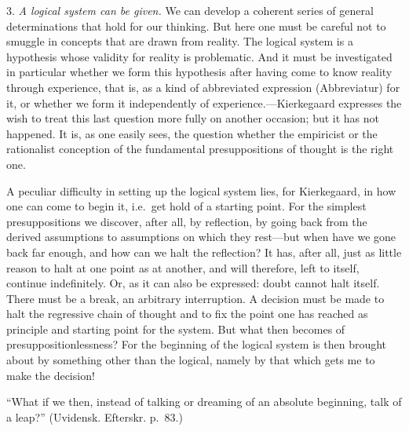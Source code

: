 \documentclass[12pt,a4paper]{book}
\newcommand{\opage}[1]{\marginnote{\footnotesize\textit{[#1]}}}
\begin{document}
3. \textit{A logical system can be given.} We can develop a coherent
series of general determinations that hold for our thinking. But here
one must be careful not to smuggle in concepts that are drawn from
reality. The logical system is a hypothesis whose validity for reality
is problematic. And it must be investigated in particular whether we form
\opage{61}this hypothesis after having come to know reality through experience,
that is, as a kind of abbreviated expression (Abbreviatur) for it, or
whether we form it independently of experience.---Kierkegaard expresses
the wish to treat this last question more fully on another occasion; but
it has not happened. It is, as one easily sees, the question whether the
empiricist or the rationalist conception of the fundamental
presuppositions of thought is the right one.

A peculiar difficulty in setting up the logical system lies, for
Kierkegaard, in how one can come to begin it, i.e.\ get hold of a
starting point. For the simplest presuppositions we discover, after all,
by reflection, by going back from the derived assumptions to assumptions
on which they rest---but when have we gone back far enough, and how can
we halt the reflection? It has, after all, just as little reason to halt
at one point as at another, and will therefore, left to itself, continue
indefinitely. Or, as it can also be expressed: doubt cannot halt itself.
There must be a break, an arbitrary interruption. A decision must be made
to halt the regressive chain of thought and to fix the point one has
reached as principle and starting point for the system. But what then
becomes of presuppositionlessness? For the beginning of the logical
system is then brought about by something other than the logical, namely
by that which gets me to make the decision!

``What if we then, instead of talking or dreaming of an absolute
beginning, talk of a leap?'' (Uvidensk. Efterskr. p.~83.)
\end{document}
